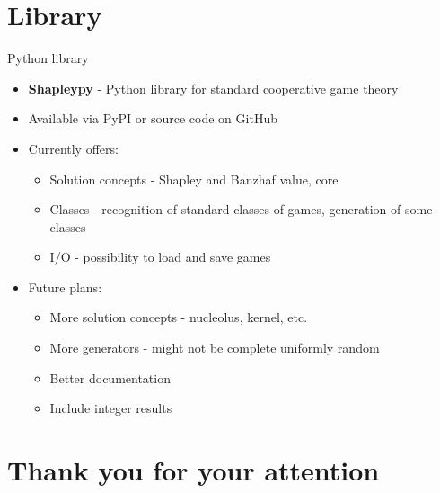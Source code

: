 \documentclass{beamer}
\begin{document}


\section{Library}


\begin{frame}{Python library}
    \pause
    \begin{itemize}
        \item \textbf{Shapleypy} - Python library for standard cooperative game theory
        \pause
        \item Available via PyPI or source code on GitHub
        \pause
        \item Currently offers:
        \begin{itemize}
            \item Solution concepts - Shapley and Banzhaf value, core
            \item Classes - recognition of standard classes of games, generation of some classes
            \item I/O - possibility to load and save games
        \end{itemize}
        \pause
        \item Future plans:
        \begin{itemize}
            \item More solution concepts - nucleolus, kernel, etc.
            \item More generators - might not be complete uniformly random
            \item Better documentation
            \item Include integer results
        \end{itemize}
    \end{itemize}
    
\end{frame}


\section{Thank you for your attention}
\end{document}
